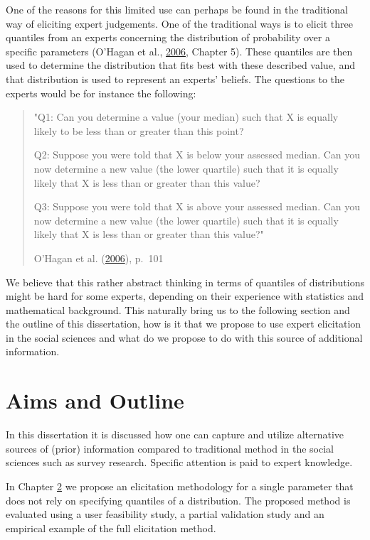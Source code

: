 \documentclass[openright,titlepage,12pt,a4paper]{book}
\begin{document}
One of the reasons for this limited use can perhaps be found in the traditional way of eliciting expert judgements. One of the traditional ways is to elicit three quantiles from an experts concerning the distribution of probability over a specific parameters (O'Hagan et al., \protect\hyperlink{ref-ohagan_uncertain_2006}{2006}, Chapter 5). These quantiles are then used to determine the distribution that fits best with these described value, and that distribution is used to represent an experts' beliefs. The questions to the experts would be for instance the following:

\begin{quote}
"Q1: Can you determine a value (your median) such that X is equally likely to be less than or greater than this point?

Q2: Suppose you were told that X is below your assessed median. Can you now determine a new value (the lower quartile) such that it is equally likely that X is less than or greater than this value?

Q3: Suppose you were told that X is above your assessed median. Can you now determine a new value (the lower quartile) such that it is equally likely that X is less than or greater than this value?"

O'Hagan et al. (\protect\hyperlink{ref-ohagan_uncertain_2006}{2006}), p.~101
\end{quote}

We believe that this rather abstract thinking in terms of quantiles of distributions might be hard for some experts, depending on their experience with statistics and mathematical background. This naturally bring us to the following section and the outline of this dissertation, how is it that we propose to use expert elicitation in the social sciences and what do we propose to do with this source of additional information.

\hypertarget{aims-and-outline}{%
\section{Aims and Outline}\label{aims-and-outline}}

In this dissertation it is discussed how one can capture and utilize alternative sources of (prior) information compared to traditional method in the social sciences such as survey research. Specific attention is paid to expert knowledge.

In Chapter \protect\hyperlink{fivestep}{2} we propose an elicitation methodology for a single parameter that does not rely on specifying quantiles of a distribution. The proposed method is evaluated using a user feasibility study, a partial validation study and an empirical example of the full elicitation method.
\end{document}
